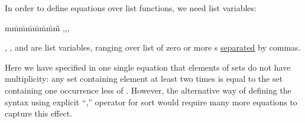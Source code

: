 
  In order to define equations over list functions, we need 
  list variables:
\begin{tabbing}
m\=m\=m\=m\=m\=m\=m\=m\=\kill
\+\+\VARIABLESBEGIN{}
\VARIABLESEND{}
\EQUATIONSBEGIN{}
{\LEX{$[$}
,,,\LEX{$]$} 
}
\EQUATIONSEND{}
\end{tabbing}

  , , and  are  list variables,
  ranging over list of zero or more s 
  \underline{separated} by commas.

  Here we have specified in one single equation that
  elements of sets do not have multiplicity:
  any set containing element  %
  at least two times is 
  equal to  the set containing one occurrence less of .
  However, the alternative way of defining the  syntax using
  explicit ``,'' operator for  sort would require
  many more equations to capture this effect.


